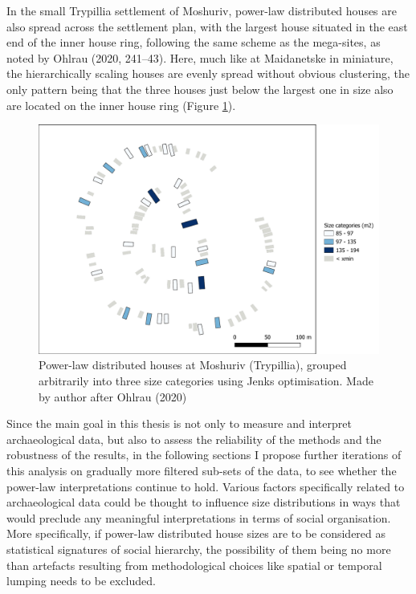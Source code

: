 \documentclass[
  12pt,
  a4paper, twoside]{book}
\begin{document}
In the small Trypillia settlement of Moshuriv, power-law distributed houses are also spread across the settlement plan, with the largest house situated in the east end of the inner house ring, following the same scheme as the mega-sites, as noted by Ohlrau (2020, 241--43). Here, much like at Maidanetske in miniature, the hierarchically scaling houses are evenly spread without obvious clustering, the only pattern being that the three houses just below the largest one in size also are located on the inner house ring (Figure \ref{fig:06-moshuriv-map}).



\begin{figure}

{\centering \includegraphics[width=0.9\linewidth]{Results/fig06_moshuriv_pl} 

}

\caption[Settlement plan of Moshuriv, with power-law houses]{Power-law distributed houses at Moshuriv (Trypillia), grouped arbitrarily into three size categories using Jenks optimisation. Made by author after Ohlrau (2020)}\label{fig:06-moshuriv-map}
\end{figure}

Since the main goal in this thesis is not only to measure and interpret archaeological data, but also to assess the reliability of the methods and the robustness of the results, in the following sections I propose further iterations of this analysis on gradually more filtered sub-sets of the data, to see whether the power-law interpretations continue to hold. Various factors specifically related to archaeological data could be thought to influence size distributions in ways that would preclude any meaningful interpretations in terms of social organisation. More specifically, if power-law distributed house sizes are to be considered as statistical signatures of social hierarchy, the possibility of them being no more than artefacts resulting from methodological choices like spatial or temporal lumping needs to be excluded.
\end{document}
